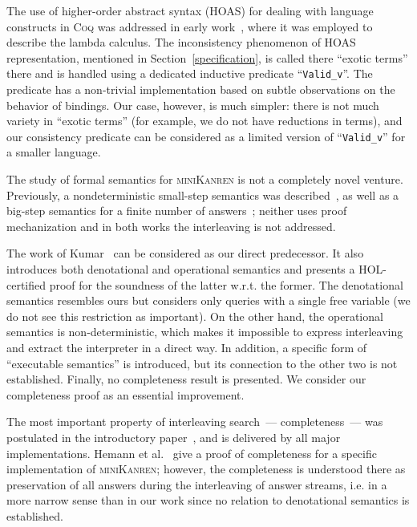 The use of higher-order abstract syntax (HOAS) for dealing with language constructs in \textsc{Coq} was addressed in early work~\cite{HOASinCoq},
where it was employed to describe the lambda calculus. The inconsistency phenomenon of HOAS representation, mentioned in Section~\ref{specification}, is called
there ``exotic terms'' there and is handled using a dedicated inductive predicate ``\lstinline|Valid_v|''. The predicate has a non-trivial implementation based
on subtle observations on the behavior of bindings. Our case, however, is much simpler: there is not much variety in ``exotic terms'' (for example, we do not have
reductions in terms), and our consistency predicate can be considered as a limited version of ``\lstinline|Valid_v|'' for a smaller language.

The study of formal semantics for \textsc{miniKanren} is not a completely novel venture. Previously, a nondeterministic
small-step semantics was described~\cite{RelConversion}, as well as a big-step semantics for a finite number of answers~\cite{DivTest};
neither uses proof mechanization and in both works the interleaving is not addressed. 

The work of Kumar~\cite{MechanisingMiniKanren} can be considered as our direct predecessor. It also introduces both denotational and
operational semantics and presents a \textsc{HOL}-certified proof for the soundness of the latter w.r.t. the former. The denotational
semantics resembles ours but considers only queries with a single free variable (we do not see this restriction as important).
On the other hand, the operational semantics is non-deterministic, which makes it
impossible to express interleaving and extract the interpreter in a direct way. In addition, a specific form of ``executable semantics''
is introduced, but its connection to the other two is not established. Finally, no completeness result is presented.
We consider our completeness proof as an essential improvement. 

The most important property of interleaving search~--- completeness~--- was postulated in the introductory paper~\cite{Search}, and is delivered by
all major implementations. Hemann et al.~\cite{SmallEmbedding} give a proof of completeness for a specific implementation of \textsc{miniKanren};
however, the completeness is understood there as
preservation of all answers during the interleaving of answer streams, i.e. in a more narrow sense than in our work since no relation
to denotational semantics is established.
